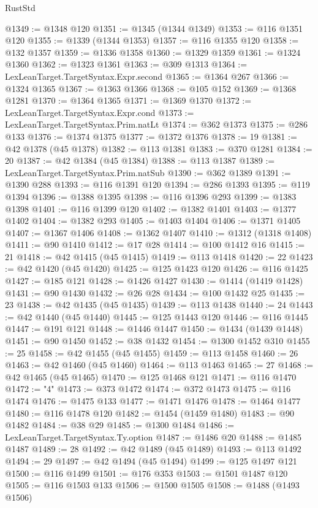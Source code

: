 \begin{lexlean}{RustStd}
\begin{coremodule}
@1349 := @1348 @120
@1351 := @1345 (@1344 @1349)
@1353 := @116 @1351 @120
@1355 := @1339 (@1344 @1353)
@1357 := @116 @1355 @120
@1358 := @132 @1357
@1359 := @1336 @1358
@1360 := @1329 @1359
@1361 := @1324 @1360
@1362 := @1323 @1361
@1363 := @309 @1313
@1364 := LexLeanTarget.TargetSyntax.Expr.second
@1365 := @1364 @267
@1366 := @1324 @1365
@1367 := @1363 @1366
@1368 := @105 @152
@1369 := @1368 @1281
@1370 := @1364 @1365
@1371 := @1369 @1370
@1372 := LexLeanTarget.TargetSyntax.Expr.cond
@1373 := LexLeanTarget.TargetSyntax.Prim.natLt
@1374 := @362 @1373
@1375 := @286 @133
@1376 := @1374 @1375
@1377 := @1372 @1376
@1378 := 19
@1381 := @42 @1378 (@45 @1378)
@1382 := @113 @1381
@1383 := @370 @1281
@1384 := 20
@1387 := @42 @1384 (@45 @1384)
@1388 := @113 @1387
@1389 := LexLeanTarget.TargetSyntax.Prim.natSub
@1390 := @362 @1389
@1391 := @1390 @288
@1393 := @116 @1391 @120
@1394 := @286 @1393
@1395 := @119 @1394
@1396 := @1388 @1395
@1398 := @116 @1396 @293
@1399 := @1383 @1398
@1401 := @116 @1399 @120
@1402 := @1382 @1401
@1403 := @1377 @1402
@1404 := @1382 @293
@1405 := @1403 @1404
@1406 := @1371 @1405
@1407 := @1367 @1406
@1408 := @1362 @1407
@1410 := @1312 (@1318 @1408)
@1411 := @90 @1410
@1412 := @17 @28
@1414 := @100 @1412 @16
@1415 := 21
@1418 := @42 @1415 (@45 @1415)
@1419 := @113 @1418
@1420 := 22
@1423 := @42 @1420 (@45 @1420)
@1425 := @125 @1423 @120
@1426 := @116 @1425
@1427 := @185 @121
@1428 := @1426 @1427
@1430 := @1414 (@1419 @1428)
@1431 := @90 @1430
@1432 := @26 @28
@1434 := @100 @1432 @25
@1435 := 23
@1438 := @42 @1435 (@45 @1435)
@1439 := @113 @1438
@1440 := 24
@1443 := @42 @1440 (@45 @1440)
@1445 := @125 @1443 @120
@1446 := @116 @1445
@1447 := @191 @121
@1448 := @1446 @1447
@1450 := @1434 (@1439 @1448)
@1451 := @90 @1450
@1452 := @38 @1432
@1454 := @1300 @1452 @310
@1455 := 25
@1458 := @42 @1455 (@45 @1455)
@1459 := @113 @1458
@1460 := 26
@1463 := @42 @1460 (@45 @1460)
@1464 := @113 @1463
@1465 := 27
@1468 := @42 @1465 (@45 @1465)
@1470 := @125 @1468 @121
@1471 := @116 @1470
@1472 := "4"
@1473 := @373 @1472
@1474 := @372 @1473
@1475 := @116 @1474
@1476 := @1475 @133
@1477 := @1471 @1476
@1478 := @1464 @1477
@1480 := @116 @1478 @120
@1482 := @1454 (@1459 @1480)
@1483 := @90 @1482
@1484 := @38 @29
@1485 := @1300 @1484
@1486 := LexLeanTarget.TargetSyntax.Ty.option
@1487 := @1486 @20
@1488 := @1485 @1487
@1489 := 28
@1492 := @42 @1489 (@45 @1489)
@1493 := @113 @1492
@1494 := 29
@1497 := @42 @1494 (@45 @1494)
@1499 := @125 @1497 @121
@1500 := @116 @1499
@1501 := @176 @353
@1503 := @1501 @1487 @120
@1505 := @116 @1503 @133
@1506 := @1500 @1505
@1508 := @1488 (@1493 @1506)

\end{coremodule}
\end{lexlean}
